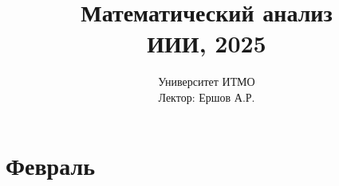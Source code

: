 \documentclass{article}
\author{}
\title{Математический анализ\\ИИИ, 2025}
\date{Университет ИТМО \\ Лектор: Ершов А.Р.}
\begin{document}
\maketitle

\tableofcontents

\newpage


\section{Февраль}

\end{document}
